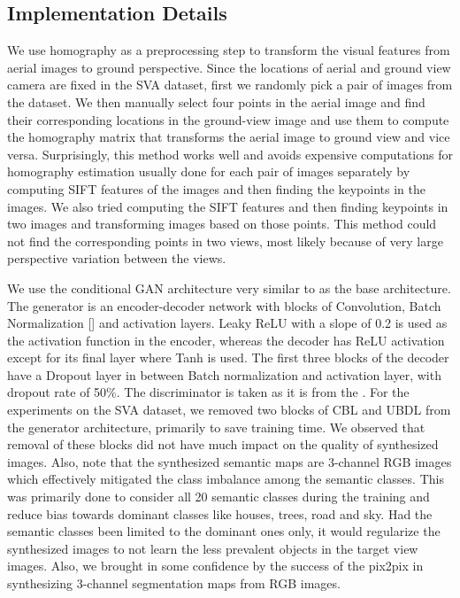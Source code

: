 \documentclass[times,twocolumn,final,authoryear]{elsarticle_modified}
\begin{document}
\vspace{-5pt}
 
\subsection{Implementation Details} 

We use homography as a preprocessing step to transform the visual features from aerial images to ground perspective. Since the locations of aerial and ground view camera are fixed in the SVA dataset, first we randomly pick a pair of images from the dataset. We then manually select four points in the aerial image and find their corresponding locations in the ground-view image and use them to compute the homography matrix that transforms the aerial image to ground view and vice versa. Surprisingly, this method works well and avoids expensive computations for homography estimation usually done for each pair of images separately by computing SIFT features of the images and then finding the keypoints in the images. We also tried computing the SIFT features and then finding keypoints in two images and transforming images based on those points. This method could not find the corresponding points in two views, most likely because of very large perspective variation between the views.

We use the conditional GAN architecture very similar to \cite{pix2pix2017} as the base architecture. The generator is an encoder-decoder network with blocks of Convolution, Batch Normalization [\cite{Ioffe:2015:BNA:3045118.3045167}] and activation layers. Leaky ReLU with a slope of 0.2 is used as the activation function in the encoder, whereas the decoder has ReLU activation except for its final layer where Tanh is used. The first three blocks of the decoder have a Dropout layer in between Batch normalization and activation layer, with dropout rate of 50\%. The discriminator is taken as it is from the \cite{pix2pix2017}. For the experiments on the SVA dataset, we removed two blocks of CBL and UBDL from the generator architecture, primarily to save training time. We observed that removal of these blocks did not have much impact on the quality of synthesized images. Also, note that the synthesized semantic maps are 3-channel RGB images which effectively mitigated the class imbalance among the semantic classes. This was primarily done to consider all 20 semantic classes during the training and reduce bias towards dominant classes like houses, trees, road and sky. Had the semantic classes been limited to the dominant ones only, it would regularize the synthesized images to not learn the less prevalent objects in the target view images. Also, we brought in some confidence by the success of the pix2pix in synthesizing 3-channel segmentation maps from RGB images.
\end{document}
